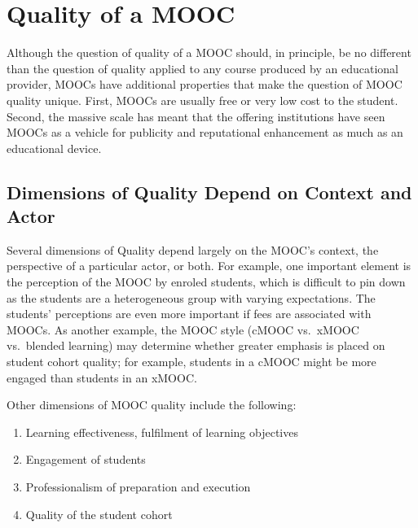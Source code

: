 \section{Quality of a MOOC}


Although the question of quality of a MOOC should, in principle, be no
different than the question of quality applied to any course produced by
an educational provider, MOOCs have additional properties that make the
question of MOOC quality unique. First, MOOCs are usually free or very
low cost to the student. Second, the massive scale has meant that the
offering institutions have seen MOOCs as a vehicle for publicity and
reputational enhancement as much as an educational device.

\subsection{Dimensions of Quality Depend on Context and Actor}

Several dimensions of Quality depend largely on the
MOOC's context, the perspective of a particular actor, or both.
For example, one important element is the perception of the MOOC by
enroled students,
which is difficult to pin down as the students are a heterogeneous group
with varying expectations. 
The students' perceptions are even more important 
if fees are associated with MOOCs.  
As another example, the MOOC style (cMOOC vs.\ xMOOC vs.\
blended learning) may determine whether greater emphasis is placed on
student cohort quality; for example, students in a
cMOOC might be more engaged than students in an xMOOC.

Other dimensions of
MOOC quality include the following:

\begin{enumerate}

\item Learning effectiveness, fulfilment of learning objectives 

\item Engagement of students

\item Professionalism of preparation and execution

\item Quality of the student cohort

\end{enumerate}


